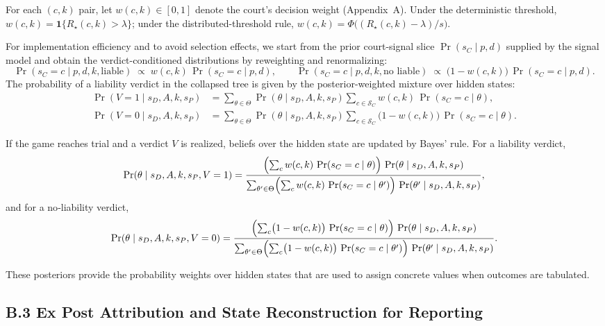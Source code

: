\documentclass{article}
\begin{document}
For each $(c,k)$ pair, let $w(c,k)\in[0,1]$ denote the court’s decision weight (Appendix~A). Under the deterministic threshold, $w(c,k)=\mathbf{1}\{R_\star(c,k)>\lambda\}$; under the distributed-threshold rule, $w(c,k)=\Phi\!\bigl((R_\star(c,k)-\lambda)/s\bigr)$.

For implementation efficiency and to avoid selection effects, we start from the prior court-signal slice $\Pr(s_C\mid p,d)$ supplied by the signal model and obtain the verdict-conditioned distributions by reweighting and renormalizing:
\[
\Pr(s_C=c\mid p,d,k,\text{liable}) \;\propto\; w(c,k)\,\Pr(s_C=c\mid p,d),\qquad
\Pr(s_C=c\mid p,d,k,\text{no liable}) \;\propto\; \bigl(1-w(c,k)\bigr)\,\Pr(s_C=c\mid p,d).
\]
The probability of a liability verdict in the collapsed tree is given by the posterior-weighted mixture over hidden states:
\begin{align*}
\Pr(V=1 \mid s_D, A, k, s_P)
  &= \sum_{\theta\in\Theta} 
       \Pr(\theta \mid s_D, A, k, s_P)
       \sum_{c\in\mathcal{S}_C} 
          w(c,k)\,\Pr(s_C=c\mid \theta), \\[6pt]
\Pr(V=0 \mid s_D, A, k, s_P)
  &= \sum_{\theta\in\Theta} 
       \Pr(\theta \mid s_D, A, k, s_P)
       \sum_{c\in\mathcal{S}_C} 
          \bigl(1-w(c,k)\bigr)\,\Pr(s_C=c\mid \theta).
\end{align*}

If the game reaches trial and a verdict $V$ is realized, beliefs over the hidden state are updated by Bayes’ rule. For a liability verdict,
\[
\Pr(\theta \mid s_D, A, k, s_P, V=1)
= \frac{\Bigl(\sum_{c} w(c,k)\,\Pr(s_C=c\mid \theta)\Bigr)\,
       \Pr(\theta \mid s_D, A, k, s_P)}
       {\sum_{\theta'\in\Theta}\Bigl(\sum_{c} w(c,k)\,\Pr(s_C=c\mid \theta')\Bigr)\,
        \Pr(\theta' \mid s_D, A, k, s_P)},
\]
and for a no‑liability verdict,
\[
\Pr(\theta \mid s_D, A, k, s_P, V=0)
= \frac{\Bigl(\sum_{c} \bigl(1-w(c,k)\bigr)\,\Pr(s_C=c\mid \theta)\Bigr)\,
       \Pr(\theta \mid s_D, A, k, s_P)}
       {\sum_{\theta'\in\Theta}\Bigl(\sum_{c} \bigl(1-w(c,k)\bigr)\,\Pr(s_C=c\mid \theta')\Bigr)\,
        \Pr(\theta' \mid s_D, A, k, s_P)}.
\]

These posteriors provide the probability weights over hidden states that are used to assign concrete values when outcomes are tabulated.

\subsection*{B.3 Ex Post Attribution and State Reconstruction for Reporting}
\end{document}
